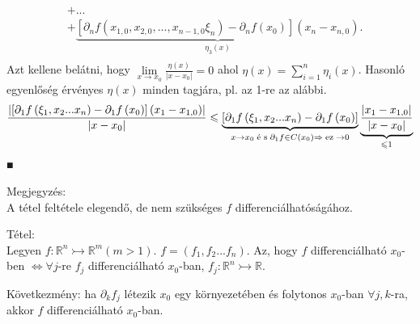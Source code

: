 \documentclass[12pt,a4paper]{scrartcl}
\newenvironment{tetel}{}{}
\newenvironment{bizonyitas}{}{}
\newenvironment{megjegyzes}{}{}
\begin{document}
\begin{bizonyitas}
\[\begin{aligned}
   &  + ... \\ 
   &  + \underbrace {\left[ {{\partial _n}f\left( {{x_{1,0}},{x_{2,0}},...,{x_{n - 1,0}}{\xi _n}} \right) - {\partial _n}f\left( {{x_0}} \right)} \right]\left( {{x_n} - {x_{n,0}}} \right)}_{{\eta _3}\left( x \right)}. \\ 
\end{aligned} \] Azt kellene belátni, hogy
\(\underset{x\rightarrow x_{0}}{\lim}\frac{\eta\left( x \right)}{\left| {x - x_{0}} \right|} = 0\)
ahol
\(\eta\left( x \right) = {\sum\limits_{i = 1}^{n}{\eta_{i}\left( x \right)}}\).
Hasonló egyenlőség érvényes \(\eta\left( x \right)\) minden tagjára, pl.
az 1-re az alábbi.
\[\frac{{\left| {\left[ {{\partial _1}f\left( {{\xi _1},{x_2}...{x_n}} \right) - {\partial _1}f\left( {{x_0}} \right)} \right]\left( {{x_1} - {x_{1,0}}} \right)} \right|}}{{\left| {x - {x_0}} \right|}} \leqslant \underbrace {\left[ {{\partial _1}f\left( {{\xi _1},{x_2}...{x_n}} \right) - {\partial _1}f\left( {{x_0}} \right)} \right]}_{x \to {x_0}{\text{\;\'e s\;}}{\partial _1}f \in C\left( {{x_0}} \right) \Rightarrow {\text{\;ez\;}} \to 0}\underbrace {\frac{{\left| {{x_1} - {x_{1,0}}} \right|}}{{\left| {x - {x_0}} \right|}}}_{ \leqslant 1}\]
■

\end{bizonyitas}

\begin{megjegyzes}

Megjegyzés:\\
A tétel feltétele elegendő, de nem szükséges \(f\)
differenciálhatóságához.

\end{megjegyzes}

\begin{tetel}

Tétel:\\
Legyen
\(\left. f:{\mathbb{R}}^{n}\rightarrowtail{\mathbb{R}}^{m}\left( {m > 1} \right) \right.\).
\(f = \left( {f_{1},f_{2}...f_{n}} \right)\). Az, hogy \(f\)
differenciálható \(x_{0}\)-ben
\(\left. \Leftrightarrow\forall j \right.\)-re \(f_{j}\)
differenciálható \(x_{0}\)-ban,
\(\left. f_{j}:{\mathbb{R}}^{n}\rightarrowtail{\mathbb{R}} \right.\).

\end{tetel}

Következmény: ha \(\partial_{k}f_{j}\) létezik \(x_{0}\) egy
környezetében és folytonos \(x_{0}\)-ban \(\forall j,k\)-ra, akkor \(f\)
differenciálható \(x_{0}\)-ban.
\end{document}
